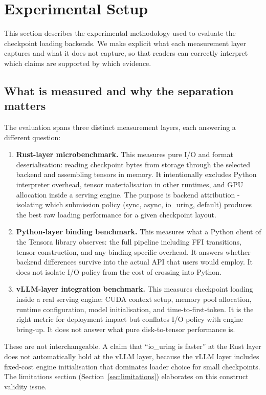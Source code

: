 \section{Experimental Setup}
\label{sec:experimental_setup}

This section describes the experimental methodology used to evaluate the checkpoint loading backends. We make explicit what each measurement layer captures and what it does not capture, so that readers can correctly interpret which claims are supported by which evidence.

\subsection{What is measured and why the separation matters}

The evaluation spans three distinct measurement layers, each answering a different question:

\begin{enumerate}
\item \textbf{Rust-layer microbenchmark.} This measures pure I/O and format deserialisation: reading checkpoint bytes from storage through the selected backend and assembling tensors in memory. It intentionally excludes Python interpreter overhead, tensor materialisation in other runtimes, and GPU allocation inside a serving engine. The purpose is backend attribution - isolating which submission policy (sync, async, io\_uring, default) produces the best raw loading performance for a given checkpoint layout.

\item \textbf{Python-layer binding benchmark.} This measures what a Python client of the Tensora library observes: the full pipeline including FFI transitions, tensor construction, and any binding-specific overhead. It answers whether backend differences survive into the actual API that users would employ. It does not isolate I/O policy from the cost of crossing into Python.

\item \textbf{vLLM-layer integration benchmark.} This measures checkpoint loading inside a real serving engine: CUDA context setup, memory pool allocation, runtime configuration, model initialisation, and time-to-first-token. It is the right metric for deployment impact but conflates I/O policy with engine bring-up. It does not answer what pure disk-to-tensor performance is.
\end{enumerate}

These are not interchangeable. A claim that ``io\_uring is faster'' at the Rust layer does not automatically hold at the vLLM layer, because the vLLM layer includes fixed-cost engine initialisation that dominates loader choice for small checkpoints. The limitations section (Section~\ref{sec:limitations}) elaborates on this construct validity issue.


